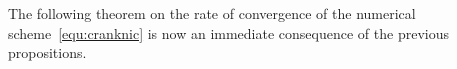 \documentclass[11pt, reqno]{amsart}
\theoremstyle{definition}
\theoremstyle{remark}
\numberwithin{equation}{section}
\newcommand{\bff}{\boldsymbol}
\newcommand{\inpro}[2]{\left\langle#1,#2\right\rangle}
\begin{document}


The following theorem on the rate of convergence of the numerical scheme~\eqref{equ:cranknic} is now an immediate consequence of the previous propositions.
\end{document}
